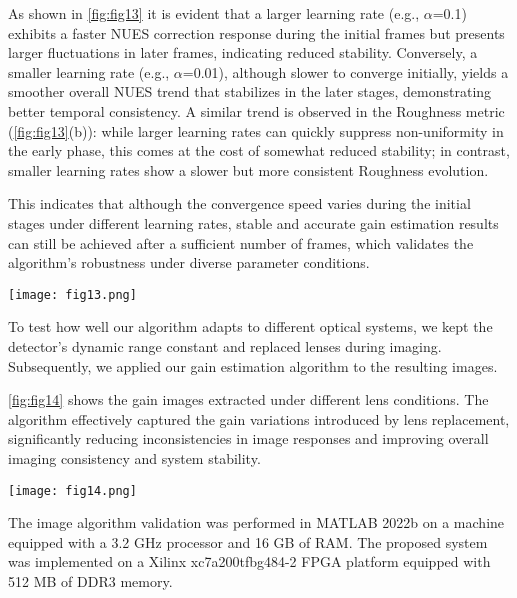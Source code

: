 \documentclass[a4paper,fleqn]{cas-dc}
\begin{document}
As shown in \cref{fig:fig13}  it is evident that a larger learning rate (e.g., $\alpha$=0.1) exhibits a faster NUES correction response during the initial frames but presents larger fluctuations in later frames, indicating reduced stability. Conversely, a smaller learning rate (e.g., $\alpha$=0.01), although slower to converge initially, yields a smoother overall NUES trend that stabilizes in the later stages, demonstrating better temporal consistency. A similar trend is observed in the Roughness metric (\cref{fig:fig13}(b)): while larger learning rates can quickly suppress non-uniformity in the early phase, this comes at the cost of somewhat reduced stability; in contrast, smaller learning rates show a slower but more consistent Roughness evolution.

This indicates that although the convergence speed varies during the initial stages under different learning rates, stable and accurate gain estimation results can still be achieved after a sufficient number of frames, which validates the algorithm’s robustness under diverse parameter conditions. 


   \begin{figure*}[ht]
    \centering
    \texttt{[image: fig13.png]}
    \caption{NUES and Roughness Curves of Extracted Gain Maps with Different Learning Rates for Data 4. (a) NUES Curve (b) Roughness Curve}
    \label{fig:fig13}
\end{figure*}

To test how well our algorithm adapts to different optical systems, we kept the detector's dynamic range constant and replaced lenses during imaging. Subsequently, we applied our gain estimation algorithm to the resulting images. 

\cref{fig:fig14} shows the gain images extracted under different lens conditions. The algorithm effectively captured the gain variations introduced by lens replacement, significantly reducing inconsistencies in image responses and improving overall imaging consistency and system stability.

   \begin{figure*}[ht]
    \centering
    \texttt{[image: fig14.png]}
    \caption{Data 5 Acquired with Lens Switching. (a) Original Image; (b) Estimated Gain; (c) Corrected Image}
    \label{fig:fig14}
\end{figure*}

The image algorithm validation was performed in MATLAB 2022b on a machine equipped with a 3.2 GHz processor and 16 GB of RAM. The proposed system was implemented on a Xilinx xc7a200tfbg484-2 FPGA platform equipped with 512 MB of DDR3 memory.
\end{document}
